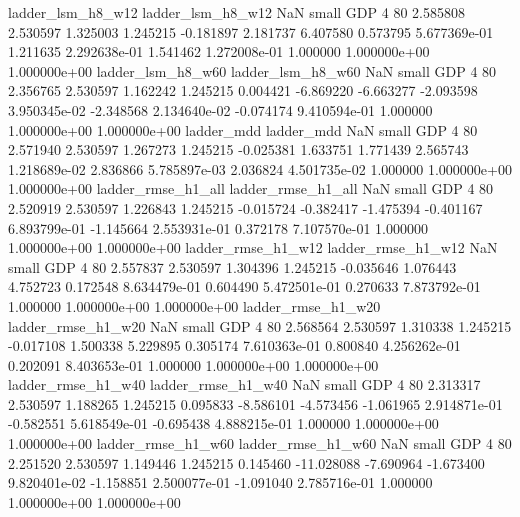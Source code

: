        ladder_lsm_h8_w12        ladder_lsm_h8_w12                   NaN      small      GDP                 4 80 2.585808       2.530597 1.325003       1.245215   -0.181897      2.181737      6.407580     0.573795   5.677369e-01  1.211635 2.292638e-01     1.541462   1.272008e-01            1.000000    1.000000e+00        1.000000e+00
       ladder_lsm_h8_w60        ladder_lsm_h8_w60                   NaN      small      GDP                 4 80 2.356765       2.530597 1.162242       1.245215    0.004421     -6.869220     -6.663277    -2.093598   3.950345e-02 -2.348568 2.134640e-02    -0.074174   9.410594e-01            1.000000    1.000000e+00        1.000000e+00
              ladder_mdd               ladder_mdd                   NaN      small      GDP                 4 80 2.571940       2.530597 1.267273       1.245215   -0.025381      1.633751      1.771439     2.565743   1.218689e-02  2.836866 5.785897e-03     2.036824   4.501735e-02            1.000000    1.000000e+00        1.000000e+00
      ladder_rmse_h1_all       ladder_rmse_h1_all                   NaN      small      GDP                 4 80 2.520919       2.530597 1.226843       1.245215   -0.015724     -0.382417     -1.475394    -0.401167   6.893799e-01 -1.145664 2.553931e-01     0.372178   7.107570e-01            1.000000    1.000000e+00        1.000000e+00
      ladder_rmse_h1_w12       ladder_rmse_h1_w12                   NaN      small      GDP                 4 80 2.557837       2.530597 1.304396       1.245215   -0.035646      1.076443      4.752723     0.172548   8.634479e-01  0.604490 5.472501e-01     0.270633   7.873792e-01            1.000000    1.000000e+00        1.000000e+00
      ladder_rmse_h1_w20       ladder_rmse_h1_w20                   NaN      small      GDP                 4 80 2.568564       2.530597 1.310338       1.245215   -0.017108      1.500338      5.229895     0.305174   7.610363e-01  0.800840 4.256262e-01     0.202091   8.403653e-01            1.000000    1.000000e+00        1.000000e+00
      ladder_rmse_h1_w40       ladder_rmse_h1_w40                   NaN      small      GDP                 4 80 2.313317       2.530597 1.188265       1.245215    0.095833     -8.586101     -4.573456    -1.061965   2.914871e-01 -0.582551 5.618549e-01    -0.695438   4.888215e-01            1.000000    1.000000e+00        1.000000e+00
      ladder_rmse_h1_w60       ladder_rmse_h1_w60                   NaN      small      GDP                 4 80 2.251520       2.530597 1.149446       1.245215    0.145460    -11.028088     -7.690964    -1.673400   9.820401e-02 -1.158851 2.500077e-01    -1.091040   2.785716e-01            1.000000    1.000000e+00        1.000000e+00
